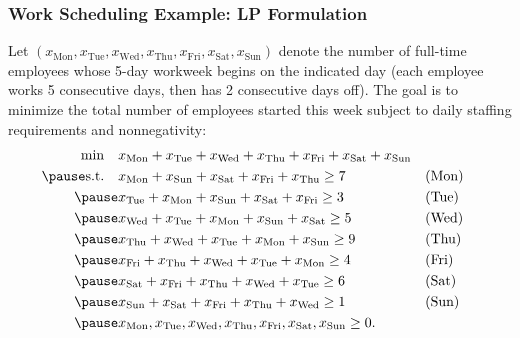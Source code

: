 \documentclass{beamer}
\begin{document}
\begin{frame}[shrink]
\frametitle{Work Scheduling Example: LP Formulation}
Let \((x_{\text{Mon}}, x_{\text{Tue}}, x_{\text{Wed}}, x_{\text{Thu}}, x_{\text{Fri}}, x_{\text{Sat}}, x_{\text{Sun}})\) denote the number of full-time employees whose 5-day workweek begins on the indicated day (each employee works 5 consecutive days, then has 2 consecutive days off). The goal is to minimize the total number of employees started this week subject to daily staffing requirements and nonnegativity:
\pause
\[
\begin{aligned}
\min \quad & x_{\text{Mon}} + x_{\text{Tue}} + x_{\text{Wed}} + x_{\text{Thu}} + x_{\text{Fri}} + x_{\text{Sat}} + x_{\text{Sun}} \\\pause
\text{s.t.} \quad
& x_{\text{Mon}} + x_{\text{Sun}} + x_{\text{Sat}} + x_{\text{Fri}} + x_{\text{Thu}} \geq 7 && \text{(Mon)} \\\pause
& x_{\text{Tue}} + x_{\text{Mon}} + x_{\text{Sun}} + x_{\text{Sat}} + x_{\text{Fri}} \geq 3 && \text{(Tue)} \\\pause
& x_{\text{Wed}} + x_{\text{Tue}} + x_{\text{Mon}} + x_{\text{Sun}} + x_{\text{Sat}} \geq 5 && \text{(Wed)} \\\pause
& x_{\text{Thu}} + x_{\text{Wed}} + x_{\text{Tue}} + x_{\text{Mon}} + x_{\text{Sun}} \geq 9 && \text{(Thu)} \\\pause
& x_{\text{Fri}} + x_{\text{Thu}} + x_{\text{Wed}} + x_{\text{Tue}} + x_{\text{Mon}} \geq 4 && \text{(Fri)} \\\pause
& x_{\text{Sat}} + x_{\text{Fri}} + x_{\text{Thu}} + x_{\text{Wed}} + x_{\text{Tue}} \geq 6 && \text{(Sat)} \\\pause
& x_{\text{Sun}} + x_{\text{Sat}} + x_{\text{Fri}} + x_{\text{Thu}} + x_{\text{Wed}} \geq 1 && \text{(Sun)} \\\pause
& x_{\text{Mon}}, x_{\text{Tue}}, x_{\text{Wed}}, x_{\text{Thu}}, x_{\text{Fri}}, x_{\text{Sat}}, x_{\text{Sun}} \geq 0 .
\end{aligned}
\]
\end{frame}
\end{document}
